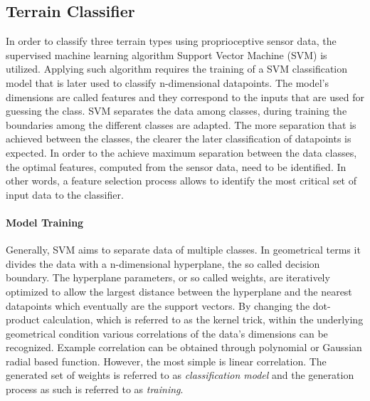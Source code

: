 \documentclass{article}
\begin{document}
\subsection{Terrain Classifier}

In order to classify three terrain types using proprioceptive sensor data, the supervised machine learning algorithm Support Vector Machine (SVM) is utilized. 
Applying such algorithm requires the training of a SVM classification model that is later used to classify n-dimensional datapoints.
The model's dimensions are called features and they correspond to the inputs that are used for guessing the class. 
SVM separates the data among classes, during training the boundaries among the different classes are adapted. 
The more separation that is achieved between the classes, the clearer the later classification of datapoints is expected. 
In order to the achieve maximum separation between the data classes, the optimal features, computed from the sensor data, need to be identified. 
In other words, a feature selection process allows to identify the most critical set of input data to the classifier. 

\paragraph*{Model Training}
Generally, SVM aims to separate data of multiple classes. 
In geometrical terms it divides the data with a n-dimensional hyperplane, the so called decision boundary. 
The hyperplane parameters, or so called weights, are iteratively optimized to allow the largest distance between the hyperplane and the nearest datapoints which eventually are the support vectors.  
By changing the dot-product calculation, which is referred to as the kernel trick, within the underlying geometrical condition various correlations of the data's dimensions can be recognized. 
Example correlation can be obtained through polynomial or Gaussian radial based function.
However, the most simple is linear correlation.
The generated set of weights is referred to as \emph{classification model} and the generation process as such is referred to as \emph{training}.%
\end{document}
